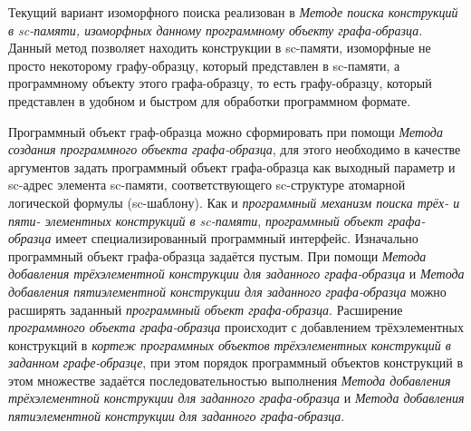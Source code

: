 Текущий вариант изоморфного поиска реализован в \textit{Методе поиска конструкций в sc-памяти, изоморфных данному программному объекту графа-образца}. Данный метод позволяет находить конструкции в sc-памяти, изоморфные не просто некоторому графу-образцу, который представлен в sc-памяти, а программному объекту этого графа-образцу, то есть графу-образцу, который представлен в удобном и быстром для обработки программном формате. 

Программный объект граф-образца можно сформировать при помощи \textit{Метода создания программного объекта графа-образца}, для этого необходимо в качестве аргументов задать программный объект графа-образца как выходный параметр и sc-адрес элемента sc-памяти, соответствующего sc-структуре атомарной логической формулы (sc-шаблону).
Как и \textit{программный механизм поиска трёх- и пяти- элементных конструкций в sc-памяти}, \textit{программный объект графа-образца} имеет специализированный программный интерфейс. Изначально программный объект графа-образца задаётся пустым. При помощи \textit{Метода добавления трёхэлементной конструкции для заданного графа-образца} и \textit{Метода добавления пятиэлементной конструкции для заданного графа-образца} можно расширять заданный \textit{программный объект графа-образца}. Расширение \textit{программного объекта графа-образца} происходит с добавлением трёхэлементных конструкций в \textit{кортеж программных объектов трёхэлементных конструкций в заданном графе-образце}, при этом порядок программный объектов конструкций в этом множестве задаётся последовательностью выполнения \textit{Метода добавления трёхэлементной конструкции для заданного графа-образца} и \textit{Метода добавления пятиэлементной конструкции для заданного графа-образца}.

